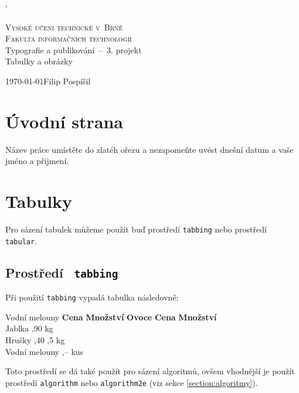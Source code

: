 \documentclass[a4paper, 11pt]{article}
\begin{document}
    \catcode`
    \begin{titlepage}
        \begin{center}
        	{\Huge\textsc{
				Vysoké učení technické v~Brně  \\
			}}
			{\huge\textsc{
				Fakulta informačních technologií \\
			}}
			{\LARGE{Typografie a publikování \,--\, 3. projekt \\
			}}
			{\Huge{Tabulky a obrázky
			}}
        \end{center}

        {\Large{\today \hfill Filip Pospíšil
        }}
    \end{titlepage}
    \section{Úvodní strana}
    Název práce umístěte do zlatéh ořezu a nezapomeňte uvést dnešní datum a vaše jméno a přijmení.
    \section{Tabulky}
    Pro sázení tabulek můžeme použít buď prostředí \verb|tabbing| nebo prostředí \verb|tabular|.
    \subsection{Prostředí \texttt{ tabbing}}
    Při použití \verb|tabbing| vypadá tabulka následovně:
    \begin{tabbing}
        Vodní melouny \quad \= \textbf{Cena} \quad  \= \textbf{Množství} \kill
        \textbf{Ovoce}  \> \textbf{Cena} \> \textbf{Množství} \\
        Jablka          ,90          kg\\
        Hrušky          ,40         ,5 kg\\
        Vodní melouny   ,--          kus\\
    \end{tabbing}
    Toto prostředí se dá také použít pro sázení algoritmů, ovšem vhodnější je použít prostředí \verb|algorithm| nebo \verb|algorithm2e| (viz sekce \ref{section:algoritmy}).
\end{document}
